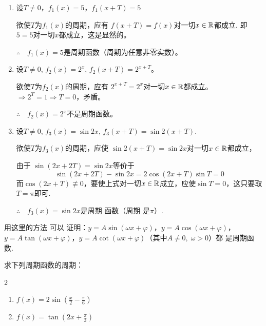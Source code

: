 \begin{solution}
\begin{enumerate}[(1)]
    \item 设$T\ne 0$，$f_1(x)=5$，$f_1(x+T)=5$
    
    欲使$T$为$f_1(x)$的周期，应有
    $f(x+T)=f(x)$对一切$x\in\mathbb{R}$都成立. 即$5=5$对一切$x$都成立，这是显然的。
    
    $\therefore\quad f_1(x)=5$是周期函数（周期为任意非零实数）。
    \item 设$T\ne 0$, $f_2(x)=2^x$, $f_2(x+T)=2^{x+T}$。
    
    欲使$T$为$f_2(x)$的周期，应有
    $2^{x+T}=2^x$对一切$x\in \mathbb{R}$都成立。$\Rightarrow 2^T=1\Rightarrow T=0$，矛盾。
    
    $\therefore\quad f_2(x)=2^x$不是周期函数。
    \item 设$T\ne 0$, $f_3(x)=\sin2x$, 
    $f_3(x+T)=\sin2(x+T)$.

    欲使$T$为$f_3(x)$的周期，应使
    $\sin2(x+T)=\sin2x$对一切$x\in\mathbb{R}$都成立，

    由于
    $\sin(2x+2T)=\sin2x$等价于
    $$\sin(2x+2T)-\sin2x=2\cos(2x+T)\sin T=0$$
而$\cos(2x+T)\not\equiv 0$，要使上式对一切$x\in\mathbb{R}$成立，应使$\sin T=0$，这只要取$T=\pi$即可.

$\therefore\quad f_3(x)=\sin 2x$是周期 函数（周期 是$\pi$）.
\end{enumerate}
\end{solution}

\begin{note}
用这里的方法 可以 证明：$y=A\sin (\omega x+\varphi)$，$y=A\cos (\omega x+\varphi)$，$y=A\tan (\omega x+\varphi)$，$y=A\cot (\omega x+\varphi)$（其中$A\ne 0,\; \omega>0$）都 是周期函数.
\end{note}

\begin{example}
求下列周期函数的周期：
\begin{multicols}{2}
\begin{enumerate}[(1)]
    \item $f(x)=2\sin\left(\frac{x}{2}-\frac{\pi}{6}\right)$
    \item $f(x)=\tan\left(2x+\frac{\pi}{3}\right)$
\end{enumerate}
\end{multicols}    
\end{example}

